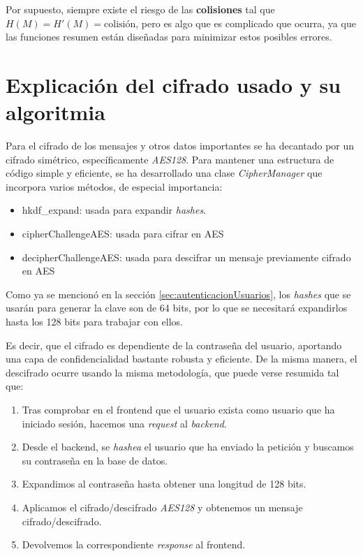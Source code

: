 \documentclass[a4paper,11pt]{article}
\begin{document}
Por supuesto, siempre existe el riesgo de las \textbf{colisiones} tal que $H(M) = H'(M) = \text{colisión}$, pero es algo que es complicado que ocurra, ya que las funciones resumen están diseñadas para minimizar estos posibles errores.

\section{Explicación del cifrado usado y su algoritmia}
Para el cifrado de los mensajes y otros datos importantes se ha decantado por un cifrado simétrico, específicamente \textit{AES128}. Para mantener una estructura de código simple y eficiente, se ha desarrollado una clase \textit{CipherManager} que incorpora varios métodos, de especial importancia:
\begin{itemize}
    \item hkdf\_expand: usada para expandir \textit{hashes}.
    \item cipherChallengeAES: usada para cifrar en AES
    \item decipherChallengeAES: usada para descifrar un mensaje previamente cifrado en AES
\end{itemize}

Como ya se mencionó en la sección \ref{sec:autenticacionUsuarios}, los \textit{hashes} que se usarán para generar la clave son de 64 bits, por lo que se necesitará expandirlos hasta los 128 bits para trabajar con ellos.

Es decir, que el cifrado es dependiente de la contraseña del usuario, aportando una capa de confidencialidad bastante robusta y eficiente. De la misma manera, el descifrado ocurre usando la misma metodología, que puede verse resumida tal que:
\begin{enumerate}
    \item Tras comprobar en el frontend que el usuario exista como usuario que ha iniciado sesión, hacemos una \textit{request} al \textit{backend}.
    \item Desde el backend, se \textit{hashea} el usuario que ha enviado la petición y buscamos su contraseña en la base de datos.
    \item Expandimos al contraseña hasta obtener una longitud de 128 bits.
    \item Aplicamos el cifrado/descifrado \textit{AES128} y obtenemos un mensaje cifrado/descifrado.
    \item Devolvemos la correspondiente \textit{response} al frontend.
\end{enumerate}
\end{document}
